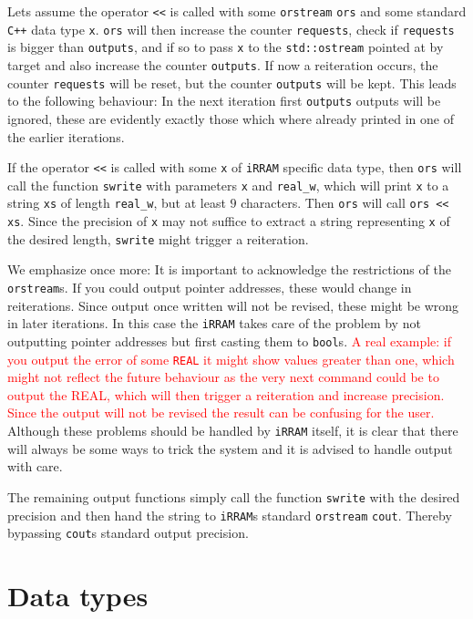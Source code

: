 \documentclass{article}
\newcommand{\irram}{\texttt{iRRAM}\xspace}
\newcommand{\irrams}{\texttt{iRRAM}s\xspace}
\newcommand{\cc}{\texttt{C++}\xspace}
\newcommand{\ir}[1]{\texttt{#1}}
\newcommand{\code}[1]{\texttt{#1}}
\newcommand{\temp}[1]{\textcolor{red}{#1}}
\begin{document}
Lets assume the operator \code{<<} is called with some \ir{orstream} \code{ors} and some standard \cc data type \code{x}. \code{ors} will then increase the counter \code{requests}, check if \code{requests} is bigger than \code{outputs}, and if so to pass \code{x} to the \ir{std::ostream} pointed at by target and also increase the counter \code{outputs}. If now a reiteration occurs, the counter \code{requests} will be reset, but the counter \code{outputs} will be kept. This leads to the following behaviour: In the next iteration first \code{outputs} outputs will be ignored, these are evidently exactly those which where already printed in one of the earlier iterations.

If the operator \code{<<} is called with some \code{x} of \irram specific data type, then \code{ors} will call the function \ir{swrite} with parameters \code{x} and \ir{real\_w}, which will print \code{x} to a string \code{xs} of length \ir{real\_w}, but at least $9$ characters. Then \code{ors} will call \code{ors << xs}. Since the precision of \code{x} may not suffice to extract a string representing \code{x} of the desired length, \ir{swrite} might trigger a reiteration.

We emphasize once more: It is important to acknowledge the restrictions of the \ir{orstream}s. If you could output pointer addresses, these would change in reiterations. Since output once written will not be revised, these might be wrong in later iterations. In this case the \irram takes care of the problem by not outputting pointer addresses but first casting them to \code{bool}s. \temp{A real example: if you output the error of some \ir{REAL} it might show values greater than one, which might not reflect the future behaviour as the very next command could be to output the REAL, which will then trigger a reiteration and increase precision. Since the output will not be revised the result can be confusing for the user.} Although these problems should be handled by \irram itself, it is clear that there will always be some ways to trick the system and it is advised to handle output with care.

The remaining output functions simply call the function \ir{swrite} with the desired precision and then hand the string to \irrams standard \ir{orstream} \ir{cout}. Thereby bypassing \ir{cout}s standard output precision.


\section{Data types}
\end{document}
